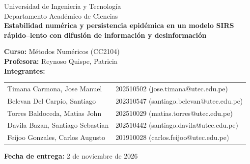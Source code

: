 \documentclass[final,5p,times,twocolumn,authoryear,11pt,nopreprintline]{elsarticle}
\newcommand{\tituloProyecto}{Estabilidad numérica y persistencia epidémica en un modelo SIRS rápido--lento con difusión de información y desinformación}
\begin{document}
\begin{titlepage}
\onecolumn
\centering
\vspace*{2cm}
{\large Universidad de Ingeniería y Tecnología}\\[0.2cm]
{\large Departamento Académico de Ciencias}\\[1.5cm]
{\Large \bfseries \tituloProyecto}\\[2cm]
\begin{minipage}{0.96\textwidth}
\centering
\large
\textbf{Curso:} Métodos Numéricos (CC2104)\\[0.3cm]
\textbf{Profesora:} Reynoso Quispe, Patricia\\[1cm]
\textbf{Integrantes:}\\[0.3cm]
{\small\begin{tabular}{@{}ll@{}}
Timana Carmona, Jose Manuel & 202510502 \quad (jose.timana@utec.edu.pe) \\[0.15cm]
Belevan Del Carpio, Santiago & 202310547 \quad (santiago.belevan@utec.edu.pe) \\[0.15cm]
Torres Baldoceda, Matias John & 202510029 \quad (matias.torres@utec.edu.pe) \\[0.15cm]
Davila Bazan, Santiago Sebastian & 202510442 \quad (santiago.davila@utec.edu.pe) \\[0.15cm]
Feijoo Gonzales, Carlos Augusto & 201910028 \quad (carlos.feijoo@utec.edu.pe)
\end{tabular}}
\end{minipage}
\vfill
\textbf{Fecha de entrega:} 2 de noviembre de 2026
\vspace*{1cm}
\end{titlepage}
\twocolumn
\end{document}
